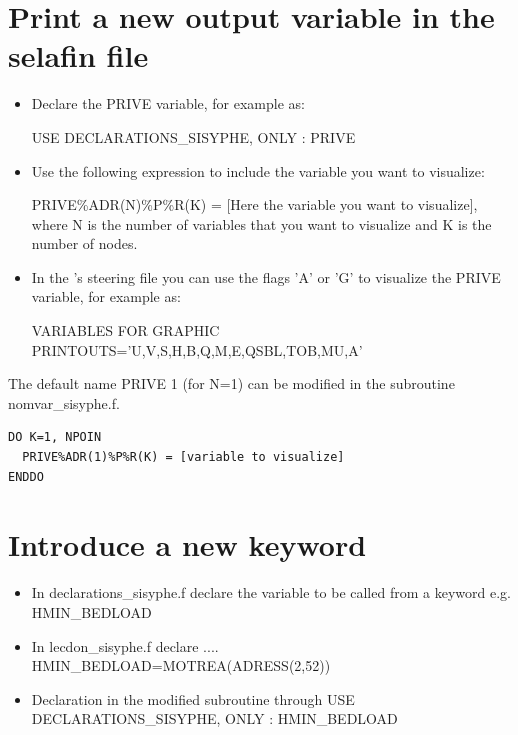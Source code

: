 \section{Print a new output variable in the selafin file}
\begin{itemize}
\item Declare the {\ttfamily PRIVE} variable, for example as:
  
{\ttfamily USE DECLARATIONS\_SISYPHE, ONLY : PRIVE}

\item Use the following expression to include the variable you want to visualize:

{\ttfamily PRIVE\%ADR(N)\%P\%R(K) = [Here the variable you want to visualize]}, where {\ttfamily N} is the number of variables that you want to visualize and {\ttfamily K} is the number of nodes.  

\item In the \sisyphe's steering file you can use the flags {\ttfamily'A'} or {\ttfamily'G'} to visualize the {\ttfamily PRIVE} variable, for example as:
  
{\ttfamily VARIABLES FOR GRAPHIC PRINTOUTS='U,V,S,H,B,Q,M,E,QSBL,TOB,MU,A'}
\end{itemize}

The default name {\ttfamily PRIVE 1} (for {\ttfamily N=1}) can be modified in the subroutine {\ttfamily nomvar\_sisyphe.f}.

\begin{lstlisting}[frame=trBL]
DO K=1, NPOIN
  PRIVE%ADR(1)%P%R(K) = [variable to visualize]
ENDDO  
\end{lstlisting}  

\section{Introduce a new keyword}
\begin{itemize}
\item In {\ttfamily declarations\_sisyphe.f} declare the variable to be called from a keyword e.g. {\ttfamily HMIN\_BEDLOAD}
\item In {\ttfamily lecdon\_sisyphe.f} declare .... {\ttfamily HMIN\_BEDLOAD=MOTREA(ADRESS(2,52))}
\item Declaration in the modified subroutine through {\ttfamily USE DECLARATIONS\_SISYPHE, ONLY : HMIN\_BEDLOAD}
\end{itemize}



